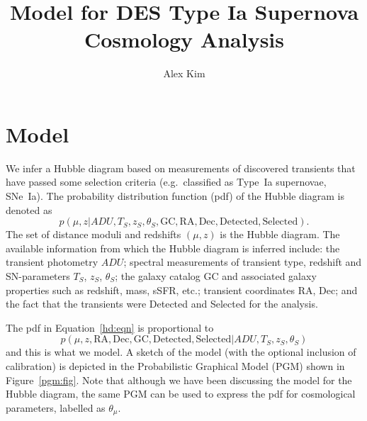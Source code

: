 \documentclass[preprint]{aastex}
\begin{document}
\title{Model for DES Type Ia Supernova Cosmology Analysis}
\author{Alex Kim}

\section{Model}
We infer a Hubble diagram based on measurements of discovered transients
that have passed some selection criteria (e.g.\ classified as Type~Ia supernovae, SNe~Ia).  The probability distribution
function (pdf) of the Hubble diagram is denoted as
\begin{equation}
p({\mu},{z} |  {{ADU}}, {{T}}_S,{{z}}_S,
{{\theta}}_S,\text{GC},
{\text{RA}}, {\text{Dec}}, \text{Detected}, {\text{Selected}}).
\label{hd:eqn}
\end{equation}
The set of distance moduli
and redshifts $(\mu, z)$ is the Hubble diagram.  The available information
from which the Hubble diagram is inferred include:
the transient photometry ${ADU}$; spectral measurements of
transient
type, redshift and SN-parameters ${T}_S$, ${z}_S$, ${\theta}_S$;
the galaxy catalog ${\text{GC}}$ and associated galaxy properties such as redshift,
mass, sSFR, etc.; transient coordinates  $\text{RA}$, $\text{Dec}$;
and the fact that the transients were Detected and Selected for the analysis.

The pdf in Equation~\ref{hd:eqn} is proportional to
\begin{equation}
p({\mu},{z}, \text{RA}, \text{Dec}, \text{GC},  \text{Detected}, {\text{Selected}}
 |  {{ADU}}, {{T}}_S,{{z}}_S,
{{\theta}}_S)
\label{hd2:eqn}
\end{equation}
and this is what we model.  A sketch of the model (with the optional inclusion
of calibration) is depicted in the Probabilistic Graphical Model
(PGM)
shown in Figure~\ref{pgm:fig}.
Note that although we have been discussing the model for the Hubble diagram, the same PGM can
 be used to express the pdf for cosmological
parameters, labelled as $\theta_\mu$.
\end{document}
